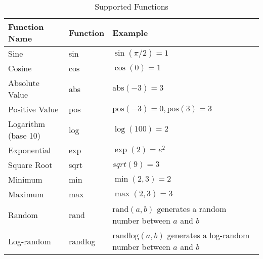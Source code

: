 \begin{table}[h]
    \centering
    \begin{tabular}{|l|l|l|}
        \hline
        \textbf{Function Name} & \textbf{Function} & \textbf{Example} \\
        \hline
        Sine & sin & $\sin(\pi/2) = 1$ \\
        Cosine & cos & $\cos(0) = 1$ \\
        Absolute Value & abs & $\text{abs}(-3) = 3$ \\
        Positive Value & pos & $\text{pos}(-3) = 0, \text{pos}(3) = 3$ \\
        Logarithm (base 10) & log & $\log(100) = 2$ \\
        Exponential & exp & $\exp(2) = e^2$ \\
        Square Root & sqrt & $sqrt(9) = 3$ \\
        Minimum & min & $\min(2, 3) = 2$ \\
        Maximum & max & $\max(2, 3) = 3$ \\
        Random & rand & $\text{rand}(a, b)$ generates a random number between $a$ and $b$ \\
        Log-random & randlog & $\text{randlog}(a, b)$ generates a log-random number between $a$ and $b$ \\
        \hline
    \end{tabular}
    \caption{Supported Functions}
\end{table}
